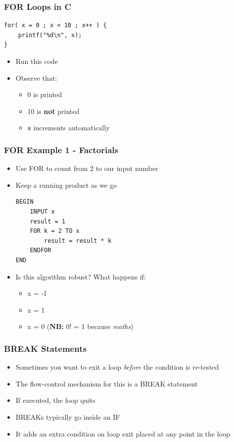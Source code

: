 \documentclass[14pt]{beamer}
\begin{document}
\begin{frame}[fragile]
\frametitle{FOR Loops in C}
\begin{lstlisting}[style=CStyle]
for( x = 0 ; x < 10 ; x++ ) {
	printf("%d\n", x);
}
\end{lstlisting}
\begin{itemize}
\item Run this code
\item Observe that:
	\begin{itemize}
		\item 0 is printed
		\item 10 is \textbf{not} printed
		\item \texttt{x} increments automatically
	\end{itemize}

\end{itemize}
\end{frame}


\begin{frame}[fragile]
\frametitle{FOR Example 1 - Factorials}
\begin{itemize}
\item Use FOR to count from 2 to our input number
\item Keep a running product as we go
\begin{lstlisting}[style=pseudo]
BEGIN
	INPUT x
	result = 1
	FOR k = 2 TO x
		result = result * k
	ENDFOR
END
\end{lstlisting}
\item Is this algorithm robust? What happens if:
	\begin{itemize}
		\item x = -1
		\item x = 1
		\item x = 0 (\textbf{NB:} 0! = 1 because \textit{maths})
	\end{itemize}
\end{itemize}
\end{frame}

\begin{frame}
\frametitle{BREAK Statements}
\begin{itemize}
\item Sometimes you want to exit a loop \textit{before} the condition is re-tested
\item The flow-control mechanism for this is a BREAK statement
\item If executed, the loop quits
\item BREAKs typically go inside an IF
\item It adds an extra condition on loop exit placed at any point in the loop
\end{itemize}
\end{frame}
\end{document}
